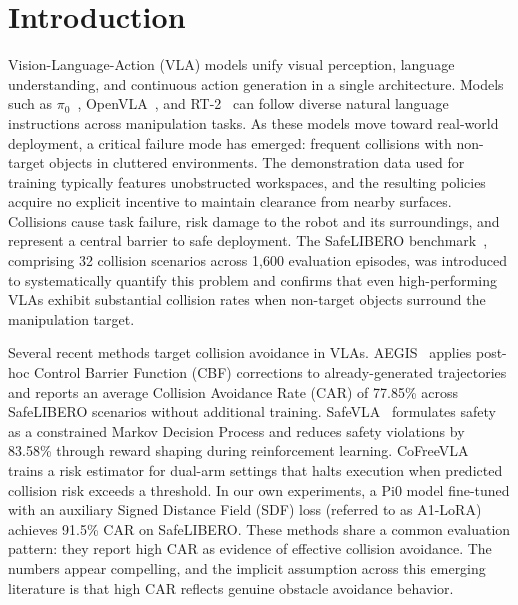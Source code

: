 \section{Introduction}

Vision-Language-Action (VLA) models unify visual perception, language understanding, and continuous action generation in a single architecture. Models such as $\pi_0$~\cite{black2024pi0}, OpenVLA~\cite{kim2024openvla}, and RT-2~\cite{brohan2023rt2} can follow diverse natural language instructions across manipulation tasks. As these models move toward real-world deployment, a critical failure mode has emerged: frequent collisions with non-target objects in cluttered environments. The demonstration data used for training typically features unobstructed workspaces, and the resulting policies acquire no explicit incentive to maintain clearance from nearby surfaces. Collisions cause task failure, risk damage to the robot and its surroundings, and represent a central barrier to safe deployment. The SafeLIBERO benchmark~\cite{hu2025vlsa}, comprising 32 collision scenarios across 1,600 evaluation episodes, was introduced to systematically quantify this problem and confirms that even high-performing VLAs exhibit substantial collision rates when non-target objects surround the manipulation target.

Several recent methods target collision avoidance in VLAs. AEGIS~\cite{hu2025vlsa} applies post-hoc Control Barrier Function (CBF) corrections to already-generated trajectories and reports an average Collision Avoidance Rate (CAR) of 77.85\% across SafeLIBERO scenarios without additional training. SafeVLA~\cite{zhang2025safevla} formulates safety as a constrained Markov Decision Process and reduces safety violations by 83.58\% through reward shaping during reinforcement learning. CoFreeVLA~\cite{cofreeevla2026} trains a risk estimator for dual-arm settings that halts execution when predicted collision risk exceeds a threshold. In our own experiments, a Pi0 model fine-tuned with an auxiliary Signed Distance Field (SDF) loss (referred to as A1-LoRA) achieves 91.5\% CAR on SafeLIBERO. These methods share a common evaluation pattern: they report high CAR as evidence of effective collision avoidance. The numbers appear compelling, and the implicit assumption across this emerging literature is that high CAR reflects genuine obstacle avoidance behavior.


